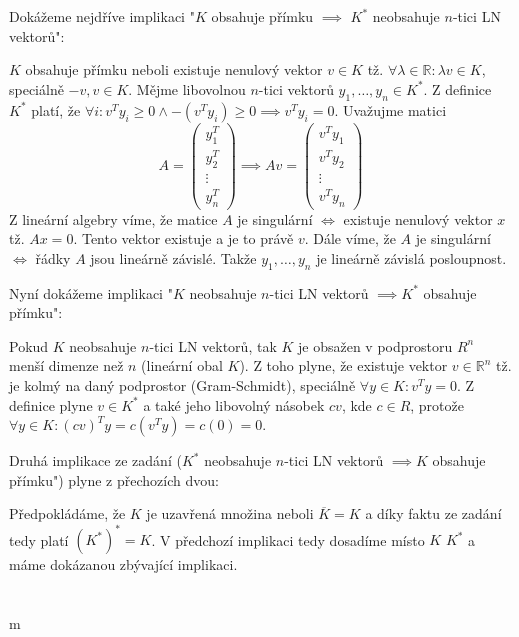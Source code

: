 \documentclass[12pt, a4paper]{article}
\begin{document}
\section{}
Dokážeme nejdříve implikaci "$K$ obsahuje přímku $\implies$ $K^*$ neobsahuje $n$-tici LN vektorů":

$K$ obsahuje přímku neboli existuje nenulový vektor $v \in K$ tž. $\forall \lambda \in \mathbb{R}: \lambda v \in K$, speciálně $-v,v \in K$. Mějme libovolnou $n$-tici vektorů $y_1,\dots,y_n \in K^*$. Z definice $K^*$ platí, že $\forall i: v^T y_i \geq 0 \land -(v^Ty_i) \geq 0 \implies v^Ty_i = 0$. Uvažujme matici
\[
A = \begin{pmatrix}
y_1^T\\
y_2^T\\
\vdots\\
y_n^T
\end{pmatrix} \implies Av = \begin{pmatrix}
v^Ty_1\\
v^Ty_2\\
\vdots\\
v^Ty_n
\end{pmatrix}
\]
Z lineární algebry víme, že matice $A$ je singulární $\iff$ existuje nenulový vektor $x$ tž. $Ax=0$. Tento vektor existuje a je to právě $v$. Dále víme, že $A$ je singulární $\iff$ řádky $A$ jsou lineárně závislé. Takže $y_1,\dots,y_n$ je lineárně závislá posloupnost.

Nyní dokážeme implikaci "$K$ neobsahuje $n$-tici LN vektorů $\implies K^*$ obsahuje přímku":

Pokud $K$ neobsahuje $n$-tici LN vektorů, tak $K$ je obsažen v podprostoru $R^n$ menší dimenze než $n$ (lineární obal $K$). Z toho plyne, že existuje vektor $v \in \mathbb{R}^n$ tž. je kolmý na daný podprostor (Gram-Schmidt), speciálně $\forall y \in K: v^T y = 0$. Z definice plyne $v \in K^*$ a také jeho libovolný násobek $cv$, kde $c \in R$, protože $\forall y \in K: (cv)^Ty = c(v^Ty) = c(0) = 0$.

Druhá implikace ze zadání ($K^*$ neobsahuje $n$-tici LN vektorů $\implies K$ obsahuje přímku") plyne z přechozích dvou:

Předpokládáme, že $K$ je uzavřená množina neboli $\overline{K} = K$ a díky faktu ze zadání tedy platí $(K^*)^* = K$. V předchozí implikaci tedy dosadíme místo $K$ $K^*$ a máme dokázanou zbývající implikaci.

\section{}
m
\end{document}
